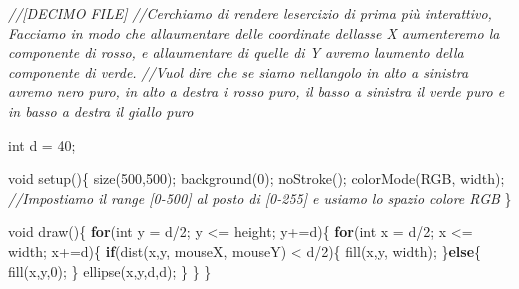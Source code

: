 \documentclass[
]{article}
\newenvironment{Shaded}{}{}
\newcommand{\CommentTok}[1]{\textcolor[rgb]{0.38,0.63,0.69}{\textit{#1}}}
\newcommand{\ControlFlowTok}[1]{\textcolor[rgb]{0.00,0.44,0.13}{\textbf{#1}}}
\newcommand{\DataTypeTok}[1]{\textcolor[rgb]{0.56,0.13,0.00}{#1}}
\newcommand{\DecValTok}[1]{\textcolor[rgb]{0.25,0.63,0.44}{#1}}
\newcommand{\FunctionTok}[1]{\textcolor[rgb]{0.02,0.16,0.49}{#1}}
\newcommand{\NormalTok}[1]{#1}
\newcommand{\OperatorTok}[1]{\textcolor[rgb]{0.40,0.40,0.40}{#1}}
\begin{document}
\begin{Shaded}
\begin{Highlighting}[]
\CommentTok{//[DECIMO FILE]}
\CommentTok{//Cerchiamo di rendere l\textquotesingle{}esercizio di prima più interattivo, Facciamo in modo che all\textquotesingle{}aumentare delle coordinate dell\textquotesingle{}asse X aumenteremo la componente di rosso, e all\textquotesingle{}aumentare di quelle di Y avremo l\textquotesingle{}aumento della componente di verde.}
\CommentTok{//Vuol dire che se siamo nell\textquotesingle{}angolo in alto a sinistra avremo nero puro, in alto a destra i rosso puro, il basso a sinistra il verde puro e in basso a destra il giallo puro}

\DataTypeTok{int}\NormalTok{ d }\OperatorTok{=} \DecValTok{40}\OperatorTok{;}

\DataTypeTok{void} \FunctionTok{setup}\OperatorTok{()\{}
  \FunctionTok{size}\OperatorTok{(}\DecValTok{500}\OperatorTok{,}\DecValTok{500}\OperatorTok{);}
  \FunctionTok{background}\OperatorTok{(}\DecValTok{0}\OperatorTok{);}
  \FunctionTok{noStroke}\OperatorTok{();}
  \FunctionTok{colorMode}\OperatorTok{(}\NormalTok{RGB}\OperatorTok{,}\NormalTok{ width}\OperatorTok{);} \CommentTok{//Impostiamo il range [0{-}500] al posto di [0{-}255] e usiamo lo spazio colore RGB}
\OperatorTok{\}}

\DataTypeTok{void} \FunctionTok{draw}\OperatorTok{()\{}
  \ControlFlowTok{for}\OperatorTok{(}\DataTypeTok{int}\NormalTok{ y }\OperatorTok{=}\NormalTok{ d}\OperatorTok{/}\DecValTok{2}\OperatorTok{;}\NormalTok{ y }\OperatorTok{\textless{}=}\NormalTok{ height}\OperatorTok{;}\NormalTok{ y}\OperatorTok{+=}\NormalTok{d}\OperatorTok{)\{}
    \ControlFlowTok{for}\OperatorTok{(}\DataTypeTok{int}\NormalTok{ x }\OperatorTok{=}\NormalTok{ d}\OperatorTok{/}\DecValTok{2}\OperatorTok{;}\NormalTok{ x }\OperatorTok{\textless{}=}\NormalTok{ width}\OperatorTok{;}\NormalTok{ x}\OperatorTok{+=}\NormalTok{d}\OperatorTok{)\{}
      \ControlFlowTok{if}\OperatorTok{(}\FunctionTok{dist}\OperatorTok{(}\NormalTok{x}\OperatorTok{,}\NormalTok{y}\OperatorTok{,}\NormalTok{ mouseX}\OperatorTok{,}\NormalTok{ mouseY}\OperatorTok{)} \OperatorTok{\textless{}}\NormalTok{ d}\OperatorTok{/}\DecValTok{2}\OperatorTok{)\{}
        \FunctionTok{fill}\OperatorTok{(}\NormalTok{x}\OperatorTok{,}\NormalTok{y}\OperatorTok{,}\NormalTok{ width}\OperatorTok{);}      
      \OperatorTok{\}}\ControlFlowTok{else}\OperatorTok{\{}
        \FunctionTok{fill}\OperatorTok{(}\NormalTok{x}\OperatorTok{,}\NormalTok{y}\OperatorTok{,}\DecValTok{0}\OperatorTok{);}
      \OperatorTok{\}}
      \FunctionTok{ellipse}\OperatorTok{(}\NormalTok{x}\OperatorTok{,}\NormalTok{y}\OperatorTok{,}\NormalTok{d}\OperatorTok{,}\NormalTok{d}\OperatorTok{);}
    \OperatorTok{\}}
  \OperatorTok{\}}
\OperatorTok{\}}
\end{Highlighting}
\end{Shaded}
\end{document}
